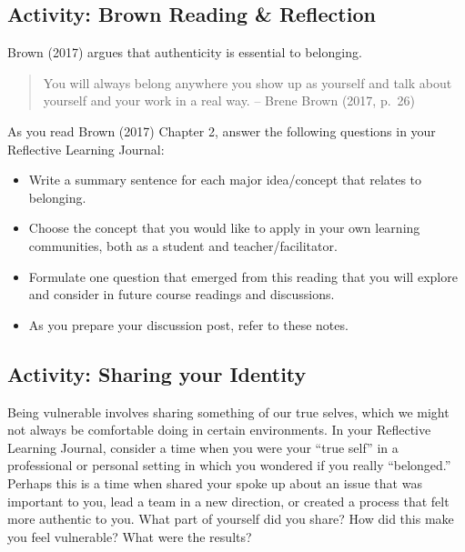 \documentclass[
]{book}
\begin{document}
\hypertarget{activity-brown-reading-reflection}{%
\subsection{Activity: Brown Reading \& Reflection}\label{activity-brown-reading-reflection}}

\begin{reflect}
Brown (2017) argues that authenticity is essential to belonging.

\begin{quote}
You will always belong anywhere you show up as yourself and talk about
yourself and your work in a real way. -- Brene Brown (2017, p.~26)
\end{quote}

As you read Brown (2017) Chapter 2, answer the following questions in
your Reflective Learning Journal:

\begin{itemize}
\item
  Write a summary sentence for each major idea/concept that relates to
  belonging.
\item
  Choose the concept that you would like to apply in your own learning
  communities, both as a student and teacher/facilitator.
\item
  Formulate one question that emerged from this reading that you will
  explore and consider in future course readings and discussions.
\item
  As you prepare your discussion post, refer to these notes.
\end{itemize}
\end{reflect}

\hypertarget{activity-sharing-your-identity}{%
\subsection{Activity: Sharing your Identity}\label{activity-sharing-your-identity}}

\begin{reflect}
Being vulnerable involves sharing something of our true selves, which we
might not always be comfortable doing in certain environments. In your
Reflective Learning Journal, consider a time when you were your ``true
self'' in a professional or personal setting in which you wondered if
you really ``belonged.'' Perhaps this is a time when shared your spoke
up about an issue that was important to you, lead a team in a new
direction, or created a process that felt more authentic to you. What
part of yourself did you share? How did this make you feel vulnerable?
What were the results?
\end{reflect}
\end{document}
